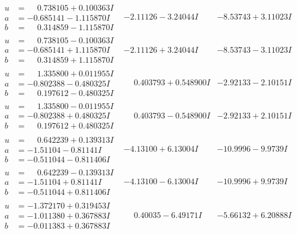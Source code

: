 \documentclass[1p]{elsarticle_modified}
\theoremstyle{definition}
\begin{document}
$$\begin{array}{c|c|c}
\begin{aligned}
u &= \phantom{-}0.738105 + 0.100363 I \\
a &= -0.685141 - 1.115870 I \\
b &= \phantom{-}0.314859 - 1.115870 I\end{aligned}
 & -2.11126 - 3.24044 I & -8.53743 + 3.11023 I \\ \hline\begin{aligned}
u &= \phantom{-}0.738105 - 0.100363 I \\
a &= -0.685141 + 1.115870 I \\
b &= \phantom{-}0.314859 + 1.115870 I\end{aligned}
 & -2.11126 + 3.24044 I & -8.53743 - 3.11023 I \\ \hline\begin{aligned}
u &= \phantom{-}1.335800 + 0.011955 I \\
a &= -0.802388 - 0.480325 I \\
b &= \phantom{-}0.197612 - 0.480325 I\end{aligned}
 & \phantom{-}0.403793 + 0.548900 I & -2.92133 - 2.10151 I \\ \hline\begin{aligned}
u &= \phantom{-}1.335800 - 0.011955 I \\
a &= -0.802388 + 0.480325 I \\
b &= \phantom{-}0.197612 + 0.480325 I\end{aligned}
 & \phantom{-}0.403793 - 0.548900 I & -2.92133 + 2.10151 I \\ \hline\begin{aligned}
u &= \phantom{-}0.642239 + 0.139313 I \\
a &= -1.51104 - 0.81141 I \\
b &= -0.511044 - 0.811406 I\end{aligned}
 & -4.13100 + 6.13004 I & -10.9996 - 9.9739 I \\ \hline\begin{aligned}
u &= \phantom{-}0.642239 - 0.139313 I \\
a &= -1.51104 + 0.81141 I \\
b &= -0.511044 + 0.811406 I\end{aligned}
 & -4.13100 - 6.13004 I & -10.9996 + 9.9739 I \\ \hline\begin{aligned}
u &= -1.372170 + 0.319453 I \\
a &= -1.011380 + 0.367883 I \\
b &= -0.011383 + 0.367883 I\end{aligned}
 & \phantom{-}0.40035 - 6.49171 I & -5.66132 + 6.20888 I \\ \hline\begin{aligned}

\end{aligned}
\end{array}$$
\end{document}
